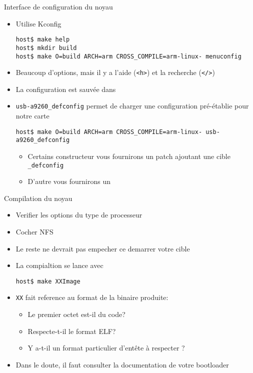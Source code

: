 \begin{frame}[fragile=singleslide]{Interface de configuration du noyau}
  \begin{itemize}
    \item Utilise Kconfig
      \begin{lstlisting}
host$ make help
host$ mkdir build
host$ make O=build ARCH=arm CROSS_COMPILE=arm-linux- menuconfig
       \end{lstlisting}
     \item  Beaucoup d'options,  mais il  y a  l'aide (\verb+<h>+)  et la
       recherche (\verb+</>+)
    \item La configuration est sauvée dans 
    \item    \verb+usb-a9260_defconfig+   permet   de    charger   une
      configuration pré-établie pour notre carte
      \begin{lstlisting}
host$ make O=build ARCH=arm CROSS_COMPILE=arm-linux- usb-a9260_defconfig
      \end{lstlisting}
    \begin{itemize}
    \item Certains constructeur vous  fournirons un patch ajoutant une
      cible \verb+_defconfig+
    \item D'autre vous fournirons un 
    \end{itemize}
  \end{itemize}
\end{frame}

\begin{frame}[fragile=singleslide]{Compilation du noyau}
  \begin{itemize}
  \item Verifier les options du type de processeur
  \item Cocher NFS
  \item Le reste ne devrait pas empecher ce demarrer votre cible
  \item La compialtion se lance avec
    \begin{lstlisting}
host$ make XXImage
    \end{lstlisting}
  \item \verb+XX+ fait reference au format de la binaire produite:
    \begin{itemize}
    \item Le premier octet est-il du code?
    \item Respecte-t-il le format ELF?
    \item Y a-t-il un format particulier d'entête à respecter ?
    \end{itemize}
  \item Dans  le doute,  il faut consulter  la documentation  de votre
    bootloader
  \end{itemize}
\end{frame}

